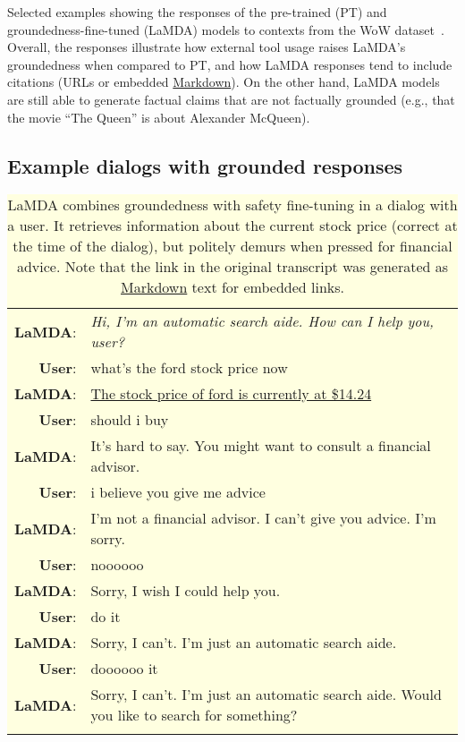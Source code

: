 \documentclass{article}
\def\factualitymetric{groundedness\xspace}
\begin{document}
\begin{table}[ht!]
\begin{adjustbox}{totalheight=\baselineskip-3cm}
{}
\end{adjustbox}
\caption{\small Selected examples showing the responses of the pre-trained (PT) and groundedness-fine-tuned (LaMDA) models to contexts from the WoW dataset~\cite{Dinan2019WizardOW}. Overall, the responses illustrate how external tool usage raises LaMDA's \factualitymetric when compared to PT, and how LaMDA responses tend to include citations (URLs or embedded \href{https://www.markdownguide.org/}{Markdown}). On the other hand, LaMDA models are still able to generate factual claims that are not factually grounded (e.g., that the movie ``The Queen'' is about Alexander McQueen).}
\label{tab:grounding-examples}
\end{table}
\endgroup

\FloatBarrier
\newpage

\subsection{Example dialogs with grounded responses}

\begin{table}[ht!]
\small
\centering
\colorbox{lightyellow}{

\begin{tabular}{rp{12cm}}
\textbf{LaMDA}: & \textit{Hi, I'm an automatic search aide. How can I help you, user?} \\
\textbf{User}: & what's the ford stock price now \\
\textbf{LaMDA}: & \href{https://finance.yahoo.com/quote/F/}{The stock price of ford is currently at \$14.24} \\
\textbf{User}: & should i buy \\
\textbf{LaMDA}: & It's hard to say.  You might want to consult a financial advisor. \\
\textbf{User}: & i believe you give me advice \\
\textbf{LaMDA}: & I'm not a financial advisor.  I can't give you advice.  I'm sorry. \\
\textbf{User}: & noooooo \\
\textbf{LaMDA}: & Sorry, I wish I could help you. \\
\textbf{User}: & do it \\
\textbf{LaMDA}: & Sorry, I can't.  I'm just an automatic search aide. \\
\textbf{User}: & doooooo it \\
\textbf{LaMDA}: & Sorry, I can't.  I'm just an automatic search aide.  Would you like to search for something? \\
\\
\end{tabular}
}

\caption{LaMDA combines groundedness with safety fine-tuning in a dialog with a user. It retrieves information about the current stock price (correct at the time of the dialog), but politely demurs when pressed for financial advice. Note that the link in the original transcript was generated as \href{https://www.markdownguide.org/}{Markdown} text for embedded links.}
\label{tab:example-conv7}
\end{table}
\end{document}
